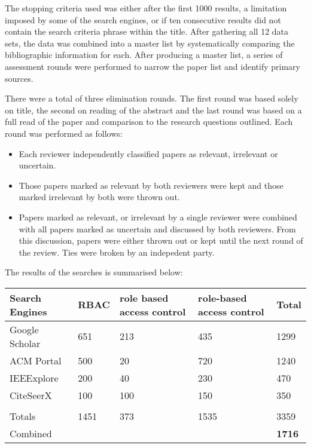 The stopping criteria used was either after the first 1000 results, a limitation imposed by some of the search engines, or if ten consecutive results did not contain the search criteria phrase within the title.  After gathering all 12 data sets, the data was combined into a master list by systematically comparing the bibliographic information for each.  After producing a master list, a series of assessment rounds were performed to narrow the paper list and identify primary sources.

There were a total of three elimination rounds.  The first round was based solely on title, the second on reading of the abstract and the last round was based on a full read of the paper and comparison to the research questions outlined.  Each round was performed as follows:

\begin{itemize}
\item {} 
Each reviewer independently classified papers as relevant, irrelevant or uncertain.
\item {} 
Those papers marked as relevant by both reviewers were kept and those marked irrelevant by both were thrown out.
\item {} 
Papers marked as relevant, or irrelevant by a single reviewer were combined with all papers marked as uncertain and discussed by both reviewers.  From this discussion, papers were either thrown out or kept until the next round of the review.  Ties were broken by an indepedent party.
\end{itemize}

The results of the searches is summarised below:

\begin{tabulary}{\linewidth}{|L|L|L|L|L|}
\hline
\textbf{
Search Engines
} & \textbf{
RBAC
} & \textbf{
role based access control
} & \textbf{
role-based access control
} & \textbf{
Total
}\\\hline

Google Scholar & 651 & 213 & 435 & 1299
\\\hline
ACM Portal & 500 & 20 & 720 & 1240
\\\hline
IEEExplore & 200 & 40 & 230 & 470
\\\hline
CiteSeerX & 100 & 100 & 150 & 350
\\\hline
 &  &  &  & 
\\\hline
Totals & 1451 & 373 & 1535 & 3359
\\\hline

Combined
 &  &  &  & 
\textbf{1716}
\\\hline
\end{tabulary}

